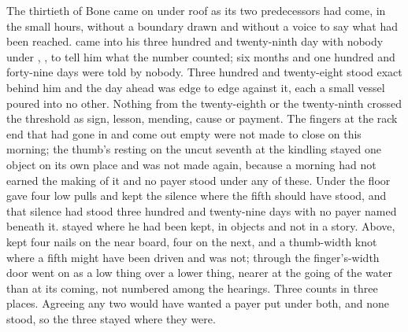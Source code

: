 
The thirtieth of Bone came on under  roof as its two predecessors had come, in the small hours, without a boundary drawn and without a voice to say what had been reached.  came into his three hundred and twenty-ninth day with nobody under , ,  to tell him what the number counted; six months and one hundred and forty-nine days were told by nobody. Three hundred and twenty-eight stood exact behind him and the day ahead was edge to edge against it, each a small vessel poured into no other. Nothing from the twenty-eighth or the twenty-ninth crossed the threshold as sign, lesson, mending, cause or payment. The fingers at the rack end that had gone in and come out empty were not made to close on this morning; the thumb's resting on the uncut seventh at the kindling stayed one object on its own place and was not made again, because a morning had not earned the making of it and no payer stood under any of these. Under the floor  gave four low pulls and kept the silence where the fifth should have stood, and that silence had stood three hundred and twenty-nine days with no payer named beneath it.  stayed where he had been kept, in objects and not in a story. Above,  kept four nails on the near board, four on the next, and a thumb-width knot where a fifth might have been driven and was not; through the finger's-width door  went on as a low thing over a lower thing, nearer at the going of the water than at its coming, not numbered among the hearings. Three counts in three places. Agreeing any two would have wanted a payer put under both, and none stood, so the three stayed where they were.


